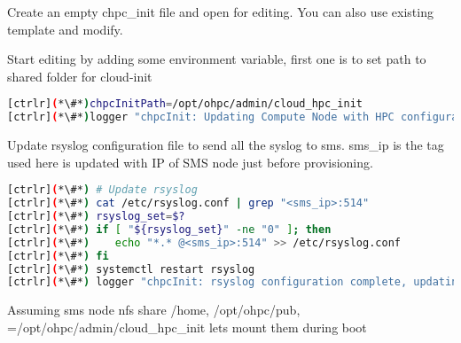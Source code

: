 	Create an empty chpc\_init file and open for editing. You can also use  existing template and modify.

	Start editing by adding some environment variable, first one is to set path to shared folder for cloud-init


\begin{lstlisting}[language=bash,keywords={}]
[ctrlr](*\#*)chpcInitPath=/opt/ohpc/admin/cloud_hpc_init
[ctrlr](*\#*)logger "chpcInit: Updating Compute Node with HPC configuration"
\end{lstlisting}

	Update rsyslog configuration file to send all the syslog to sms. sms\_ip is the tag used here is updated with IP of SMS node just before provisioning.

\begin{lstlisting}[language=bash,keywords={}]
[ctrlr](*\#*) # Update rsyslog
[ctrlr](*\#*) cat /etc/rsyslog.conf | grep "<sms_ip>:514"
[ctrlr](*\#*) rsyslog_set=$?
[ctrlr](*\#*) if [ "${rsyslog_set}" -ne "0" ]; then
[ctrlr](*\#*)    echo "*.* @<sms_ip>:514" >> /etc/rsyslog.conf
[ctrlr](*\#*) fi
[ctrlr](*\#*) systemctl restart rsyslog
[ctrlr](*\#*) logger "chpcInit: rsyslog configuration complete, updating remaining HPC configuration"
\end{lstlisting}

	Assuming sms node nfs share /home, /opt/ohpc/pub, =/opt/ohpc/admin/cloud\_hpc\_init lets mount them during boot

